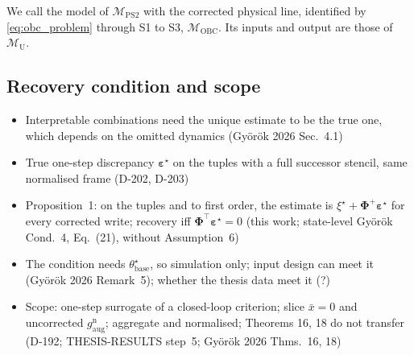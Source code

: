 We call the model of $\mathcal M_{\mathrm{PS2}}$ with the corrected physical
line, identified by \eqref{eq:obc_problem} through S1 to S3,
$\mathcal M_{\mathrm{OBC}}$.
Its inputs and output are those of $\mathcal M_{\mathrm U}$.

\subsection{Recovery condition and scope}\label{sec:obc_scope}
\ifdraft
\begin{itemize}
\item Interpretable combinations need the unique estimate to be the true one, which depends on the omitted dynamics (Gy\"or\"ok 2026 Sec.~4.1)
\item True one-step discrepancy $\boldsymbol\varepsilon^\star$ on the tuples with a full successor stencil, same normalised frame (D-202, D-203)
\item Proposition~1: on the tuples and to first order, the estimate is $\xi^\star+\boldsymbol\Phi^{+}\boldsymbol\varepsilon^\star$ for every corrected write; recovery iff $\boldsymbol\Phi^\top\boldsymbol\varepsilon^\star=0$ (this work; state-level Gy\"or\"ok Cond.~4, Eq.~(21), without Assumption~6)
\item The condition needs $\theta^\star_{\mathrm{base}}$, so simulation only; input design can meet it (Gy\"or\"ok 2026 Remark~5); whether the thesis data meet it (?)
\item Scope: one-step surrogate of a closed-loop criterion; slice $\bar x=0$ and uncorrected $g^{\mathrm n}_{\mathrm{aug}}$; aggregate and normalised; Theorems 16, 18 do not transfer (D-192; THESIS-RESULTS step~5; Gy\"or\"ok 2026 Thms.~16, 18)
\end{itemize}
\fi

